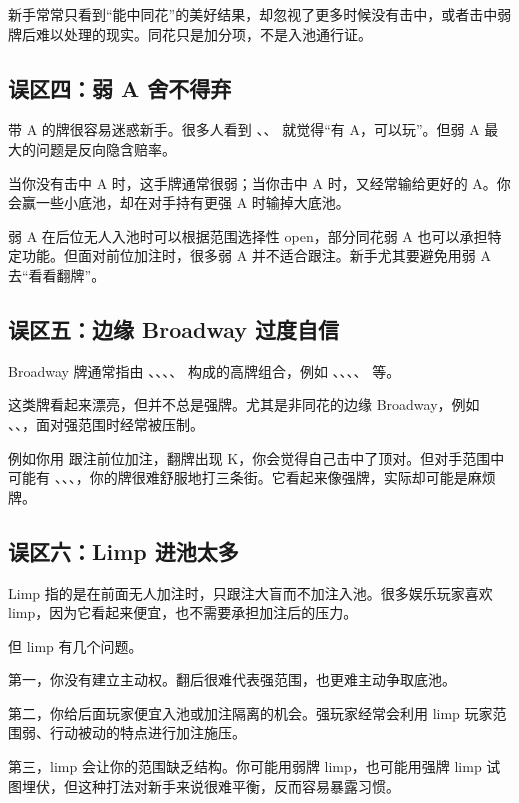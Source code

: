 新手常常只看到“能中同花”的美好结果，却忽视了更多时候没有击中，或者击中弱牌后难以处理的现实。同花只是加分项，不是入池通行证。

\subsection{误区四：弱 A 舍不得弃}

带 A 的牌很容易迷惑新手。很多人看到 、、 就觉得“有 A，可以玩”。但弱 A 最大的问题是反向隐含赔率。

当你没有击中 A 时，这手牌通常很弱；当你击中 A 时，又经常输给更好的 A。你会赢一些小底池，却在对手持有更强 A 时输掉大底池。

弱 A 在后位无人入池时可以根据范围选择性 open，部分同花弱 A 也可以承担特定功能。但面对前位加注时，很多弱 A 并不适合跟注。新手尤其要避免用弱 A 去“看看翻牌”。

\subsection{误区五：边缘 Broadway 过度自信}

Broadway 牌通常指由 、、、、 构成的高牌组合，例如 、、、、 等。

这类牌看起来漂亮，但并不总是强牌。尤其是非同花的边缘 Broadway，例如 、、，面对强范围时经常被压制。

例如你用  跟注前位加注，翻牌出现 K，你会觉得自己击中了顶对。但对手范围中可能有 、、、，你的牌很难舒服地打三条街。它看起来像强牌，实际却可能是麻烦牌。

\subsection{误区六：Limp 进池太多}

Limp 指的是在前面无人加注时，只跟注大盲而不加注入池。很多娱乐玩家喜欢 limp，因为它看起来便宜，也不需要承担加注后的压力。

但 limp 有几个问题。

第一，你没有建立主动权。翻后很难代表强范围，也更难主动争取底池。

第二，你给后面玩家便宜入池或加注隔离的机会。强玩家经常会利用 limp 玩家范围弱、行动被动的特点进行加注施压。

第三，limp 会让你的范围缺乏结构。你可能用弱牌 limp，也可能用强牌 limp 试图埋伏，但这种打法对新手来说很难平衡，反而容易暴露习惯。

